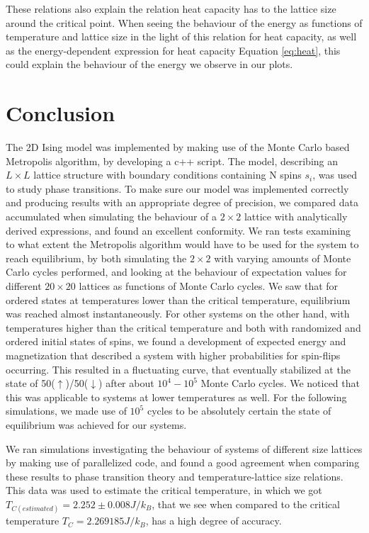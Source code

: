 \documentclass[10pt, nofootinbib, twocolumn]{revtex4-1}
\begin{document}
These relations also explain the relation heat capacity has to the lattice size around the critical point. When seeing the behaviour of the energy as functions of temperature and lattice size in the light of this relation for heat capacity, as well as the energy-dependent expression for heat capacity Equation \eqref{eq:heat}, this could explain the behaviour of the energy we observe in our plots.

\cleardoublepage
\section{Conclusion}\label{sec:conclusion}
The 2D Ising model was implemented by making use of the Monte Carlo based Metropolis algorithm, by developing a c++ script. The model, describing an $L\times L$ lattice structure with boundary conditions containing N spins $s_i$, was used to study phase transitions. To make sure our model was implemented correctly and producing results with an appropriate degree of precision, we compared data accumulated when simulating the behaviour of a $2\times 2$ lattice with analytically derived expressions, and found an excellent conformity. We ran tests examining to what extent the Metropolis algorithm would have to be used for the system to reach equilibrium, by both simulating the $2\times 2$ with varying amounts of Monte Carlo cycles performed, and looking at the behaviour of expectation values for different $20\times 20$ lattices as functions of Monte Carlo cycles. We saw that for ordered states at temperatures lower than the critical temperature, equilibrium was reached almost instantaneously. For other systems on the other hand, with temperatures higher than the critical temperature and both with randomized and ordered initial states of spins, we found a development of expected energy and magnetization that described a system with higher probabilities for spin-flips occurring. This resulted in a fluctuating curve, that eventually stabilized at the state of 50($\uparrow$)/50($\downarrow$) after about $10^4-10^5$ Monte Carlo cycles. We noticed that this was applicable to systems at lower temperatures as well. For the following simulations, we made use of $10^5$ cycles to be absolutely certain the state of equilibrium was achieved for our systems.

We ran simulations investigating the behaviour of systems of different size lattices by making use of parallelized code, and found a good agreement when comparing these results to phase transition theory and temperature-lattice size relations. This data was used to estimate the critical temperature, in which we got $T_{C(estimated)} =2.252 \pm 0.008 J/k_B$, that we see when compared to the critical temperature $T_C=2.269185J/k_B$, has a high degree of accuracy. 
\end{document}
